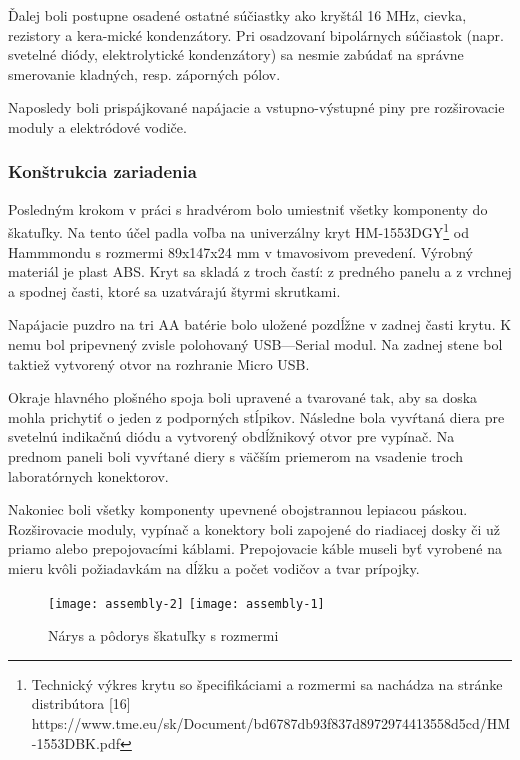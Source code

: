 \documentclass[titlepage,12pt]{article}
\begin{document}
Ďalej boli postupne osadené ostatné súčiastky ako kryštál 16 MHz, cievka, rezistory a kera-mické kondenzátory. Pri osadzovaní bipolárnych súčiastok (napr. svetelné diódy, elektrolytické kondenzátory) sa nesmie zabúdať na správne smerovanie kladných, resp. záporných pólov.

Naposledy boli prispájkované napájacie a vstupno-výstupné piny pre rozširovacie moduly \linebreak a elektródové vodiče.

\newpage
\subsubsection{Konštrukcia zariadenia}
Posledným krokom v práci s hradvérom bolo umiestniť všetky komponenty do škatuľky. Na tento účel padla voľba na univerzálny kryt HM-1553DGY\footnote{Technický výkres krytu so špecifikáciami a rozmermi sa nachádza na stránke distribútora [16] \\ https://www.tme.eu/sk/Document/bd6787db93f837d8972974413558d5cd/HM-1553DBK.pdf} od Hammmondu s rozmermi \linebreak 89x147x24 mm v tmavosivom prevedení. Výrobný materiál je plast ABS. Kryt sa skladá \linebreak z troch častí: z predného panelu a z vrchnej a spodnej časti, ktoré sa uzatvárajú štyrmi skrutkami. 

Napájacie puzdro na tri AA batérie bolo uložené pozdĺžne v zadnej časti krytu. K nemu bol pripevnený zvisle polohovaný USB—Serial modul. Na zadnej stene bol taktiež vytvorený otvor na rozhranie Micro USB.

Okraje hlavného plošného spoja boli upravené a tvarované tak, aby sa doska mohla prichytiť o jeden z podporných stĺpikov. Následne bola vyvŕtaná diera pre svetelnú indikačnú diódu \linebreak a vytvorený obdĺžnikový otvor pre vypínač. Na prednom paneli boli vyvŕtané diery s väčším priemerom na vsadenie troch laboratórnych konektorov.

Nakoniec boli všetky komponenty upevnené obojstrannou lepiacou páskou. Rozširovacie moduly, vypínač a konektory boli zapojené do riadiacej dosky či už priamo alebo prepojovacími káblami. Prepojovacie káble museli byť vyrobené na mieru kvôli požiadavkám na dĺžku a počet vodičov a tvar prípojky.


\begin{figure}[!ht]
\begin{center}
\texttt{[image: assembly-2]}
\texttt{[image: assembly-1]}
\caption{Nárys a pôdorys škatuľky s rozmermi}
\end{center}
\end{figure}
\end{document}
